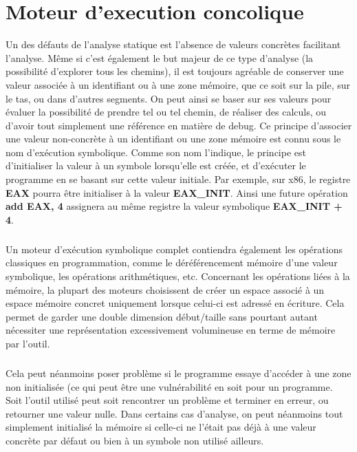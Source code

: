 \section{Moteur d'execution concolique}
Un des défauts de l'analyse statique est l'absence de valeurs concrètes facilitant l'analyse. Même si c'est également
le but majeur de ce type d'analyse (la possibilité d'explorer tous les chemins), il est toujours agréable de conserver une valeur
associée à un identifiant ou à une zone mémoire, que ce soit sur la pile, sur le tas, ou dans d'autres segments. On peut ainsi se baser
sur ses valeurs pour évaluer la possibilité de prendre tel ou tel chemin, de réaliser des calculs, ou d'avoir tout simplement une référence en
matière de debug.
Ce principe d'associer une valeur non-concrète à un identifiant ou une zone mémoire est connu sous le nom d'exécution symbolique. Comme son nom
l'indique, le principe est d'initialiser la valeur à un symbole lorsqu'elle est créée, et d'exécuter le programme en se basant sur cette valeur initiale.
Par exemple, sur x86, le registre \textbf{EAX} pourra être initialiser à la valeur \textbf{EAX\_INIT}. Ainsi une future opération \textbf{add EAX, 4} assignera
au même registre la valeur symbolique \textbf{EAX\_INIT + 4}.

\subparagraph{}
Un moteur d'exécution symbolique complet contiendra également les opérations classiques en programmation, comme le déréférencement mémoire d'une valeur
symbolique, les opérations arithmétiques, etc. Concernant les opérations liées à la mémoire, la plupart des moteurs choisissent de créer un espace associé à
un espace mémoire concret uniquement lorsque celui-ci est adressé en écriture. Cela permet de garder une double dimension début/taille sans pourtant autant
nécessiter une représentation excessivement volumineuse en terme de mémoire par l'outil.
\subparagraph{}
Cela peut néanmoins poser problème si le programme essaye d'accéder à une
zone non initialisée (ce qui peut être une vulnérabilité en soit pour un programme. Soit l'outil utilisé peut soit rencontrer un problème et terminer en erreur,
ou retourner une valeur nulle. Dans certains cas d'analyse, on peut néanmoins tout simplement initialisé la mémoire si celle-ci ne l'était pas déjà à une valeur concrète
par défaut ou bien à un symbole non utilisé ailleurs.

